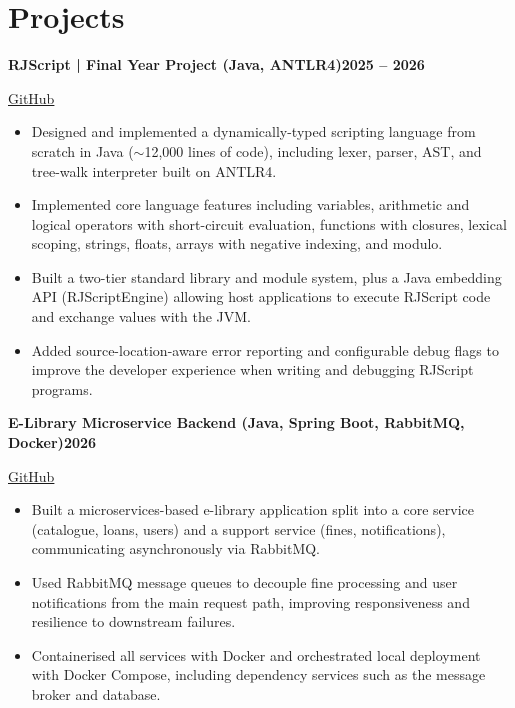 \documentclass[10pt]{article}
\newcommand{\entry}[2]{\textbf{#1}\hfill\textbf{#2}\par}
\begin{document}
\section{Projects}
\entry{RJScript \normalfont\textcolor{muted}{| Final Year Project (Java, ANTLR4)}}{2025 -- 2026}
\href{https://github.com/seanieStack/RJScript-FYP}{GitHub}
\begin{itemize}
  \item Designed and implemented a dynamically-typed scripting language from scratch in Java ($\sim$12{,}000 lines of code), including lexer, parser, AST, and tree-walk interpreter built on ANTLR4.
  \item Implemented core language features including variables, arithmetic and logical operators with short-circuit evaluation, functions with closures, lexical scoping, strings, floats, arrays with negative indexing, and modulo.
  \item Built a two-tier standard library and module system, plus a Java embedding API (RJScriptEngine) allowing host applications to execute RJScript code and exchange values with the JVM.
  \item Added source-location-aware error reporting and configurable debug flags to improve the developer experience when writing and debugging RJScript programs.
\end{itemize}

\vspace{3pt}
\entry{E-Library Microservice Backend \normalfont\textcolor{muted}{(Java, Spring Boot, RabbitMQ, Docker)}}{2026}
\href{https://github.com/seanieStack/SoftwareArchitectureProject}{GitHub}
\begin{itemize}
  \item Built a microservices-based e-library application split into a core service (catalogue, loans, users) and a support service (fines, notifications), communicating asynchronously via RabbitMQ.
  \item Used RabbitMQ message queues to decouple fine processing and user notifications from the main request path, improving responsiveness and resilience to downstream failures.
  \item Containerised all services with Docker and orchestrated local deployment with Docker Compose, including dependency services such as the message broker and database.
\end{itemize}

\end{document}
